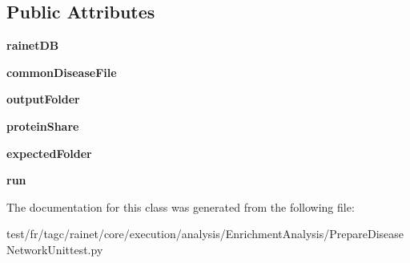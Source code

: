 \subsection*{Public Attributes}
\begin{DoxyCompactItemize}
\item 
\hypertarget{classPrepareDiseaseNetworkUnittest_1_1PrepareDiseaseNetworkUnittest_a19e9056f8a1916bfbc73c40b1db01d12}{{\bfseries rainet\-D\-B}}\label{classPrepareDiseaseNetworkUnittest_1_1PrepareDiseaseNetworkUnittest_a19e9056f8a1916bfbc73c40b1db01d12}

\item 
\hypertarget{classPrepareDiseaseNetworkUnittest_1_1PrepareDiseaseNetworkUnittest_a4cd2f3dc08ea157600b1ca016dc180ca}{{\bfseries common\-Disease\-File}}\label{classPrepareDiseaseNetworkUnittest_1_1PrepareDiseaseNetworkUnittest_a4cd2f3dc08ea157600b1ca016dc180ca}

\item 
\hypertarget{classPrepareDiseaseNetworkUnittest_1_1PrepareDiseaseNetworkUnittest_a028d8940c465d5eb8926094e67563f62}{{\bfseries output\-Folder}}\label{classPrepareDiseaseNetworkUnittest_1_1PrepareDiseaseNetworkUnittest_a028d8940c465d5eb8926094e67563f62}

\item 
\hypertarget{classPrepareDiseaseNetworkUnittest_1_1PrepareDiseaseNetworkUnittest_a9ef0d98ecd1dca11584c3099e13eff70}{{\bfseries protein\-Share}}\label{classPrepareDiseaseNetworkUnittest_1_1PrepareDiseaseNetworkUnittest_a9ef0d98ecd1dca11584c3099e13eff70}

\item 
\hypertarget{classPrepareDiseaseNetworkUnittest_1_1PrepareDiseaseNetworkUnittest_aac5898c499329fe409c890084d1ef216}{{\bfseries expected\-Folder}}\label{classPrepareDiseaseNetworkUnittest_1_1PrepareDiseaseNetworkUnittest_aac5898c499329fe409c890084d1ef216}

\item 
\hypertarget{classPrepareDiseaseNetworkUnittest_1_1PrepareDiseaseNetworkUnittest_ab7132da01ed2f8c0a0c0c866ae5592f9}{{\bfseries run}}\label{classPrepareDiseaseNetworkUnittest_1_1PrepareDiseaseNetworkUnittest_ab7132da01ed2f8c0a0c0c866ae5592f9}

\end{DoxyCompactItemize}


The documentation for this class was generated from the following file\-:\begin{DoxyCompactItemize}
\item 
test/fr/tagc/rainet/core/execution/analysis/\-Enrichment\-Analysis/Prepare\-Disease\-Network\-Unittest.\-py\end{DoxyCompactItemize}
